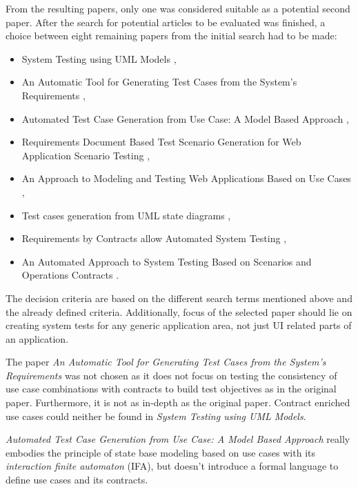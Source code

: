 From the resulting papers, only one was considered suitable as a potential second paper. After the search for potential articles to be evaluated was finished, a choice between eight remaining papers from the initial search had to be made:

\begin{itemize}
	\item System Testing using UML Models \cite{MonalisaSarma2007},
	\item An Automatic Tool for Generating Test Cases from the System's Requirements \cite{RosziatiIbrahim2007},
	\item Automated Test Case Generation from Use Case: A Model Based Approach \cite{LizheChen2010},
	\item Requirements Document Based Test Scenario Generation for Web Application Scenario Testing \cite{XiaojingZhang2015},
	\item An Approach to Modeling and Testing Web Applications Based on Use Cases \cite{LipingLi2008},
	\item Test cases generation from UML state diagrams \cite{YGKim1999},
	\item Requirements by Contracts allow Automated System Testing \cite{ClementineNebut2003},
	\item An Automated Approach to System Testing Based on Scenarios and Operations Contracts \cite{NajlaRaza2007}.
\end{itemize}

The decision criteria are based on the different search terms mentioned above and the already defined criteria. Additionally, focus of the selected paper should lie on creating system tests for any generic application area, not just UI related parts of an application.

The paper \textit{An Automatic Tool for Generating Test Cases from the System's Requirements} was not chosen as it does not focus on testing the consistency of use case combinations with contracts to build test objectives as in the original paper. Furthermore, it is not as in-depth as the original paper. Contract enriched use cases could neither be found in \textit{System Testing using UML Models}.

\textit{Automated Test Case Generation from Use Case: A Model Based Approach} really embodies the principle of state base modeling based on use cases with its \textit{interaction finite automaton} (IFA), but doesn't introduce a formal language to define use cases and its contracts.

